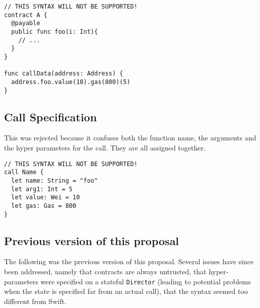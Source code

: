 \begin{verbatim}
// THIS SYNTAX WILL NOT BE SUPPORTED!
contract A {
  @payable
  public func foo(i: Int){
    // ...
  }
}

func callData(address: Address) {
  address.foo.value(10).gas(800)(5)
}
\end{verbatim}

\subsection{Call Specification}

This was rejected because it confuses both the function name, the arguments and the hyper parameters for the call. They are all assigned together.

\begin{verbatim}
// THIS SYNTAX WILL NOT BE SUPPORTED!
call Name {
  let name: String = "foo"
  let arg1: Int = 5
  let value: Wei = 10
  let gas: Gas = 800
}
\end{verbatim}

\subsection{Previous version of this proposal}

The following was the previous version of this proposal. Several issues have since been addressed, namely that contracts are always untrusted, that hyper-parameters were specified on a stateful \texttt{Director} (leading to potential problems when the state is specified far from an actual call), that the syntax seemed too different from Swift.

